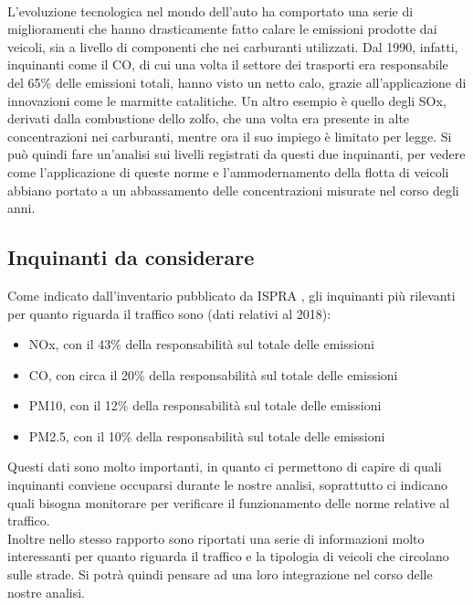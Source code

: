 \documentclass{article}
\begin{document}
\\L'evoluzione tecnologica nel mondo dell'auto ha comportato una serie di miglioramenti che hanno drasticamente fatto calare le emissioni prodotte dai veicoli, sia a livello di componenti che nei carburanti utilizzati. Dal 1990, infatti, inquinanti come il CO, di cui una volta il settore dei trasporti era responsabile del 65\% delle emissioni totali, hanno visto un netto calo, grazie all'applicazione di innovazioni come le marmitte catalitiche. Un altro esempio è quello degli SOx, derivati dalla combustione dello zolfo, che una volta era presente in alte concentrazioni nei carburanti, mentre ora il suo impiego è limitato per legge. Si può quindi fare un'analisi sui livelli registrati da questi due inquinanti, per vedere come l'applicazione di queste norme e l'ammodernamento della flotta di veicoli abbiano portato a un abbassamento delle concentrazioni misurate nel corso degli anni.

\subsection{Inquinanti da considerare}
Come indicato dall'inventario pubblicato da ISPRA \cite{iir2020}, gli inquinanti più rilevanti per quanto riguarda il traffico sono (dati relativi al 2018): 
\begin{itemize}
	\item NOx, con il 43\% della responsabilità sul totale delle emissioni
	\item CO, con circa il 20\% della responsabilità sul totale delle emissioni
	\item PM10, con il 12\% della responsabilità sul totale delle emissioni
	\item PM2.5, con il 10\% della responsabilità sul totale delle emissioni
\end{itemize}
Questi dati sono molto importanti, in quanto ci permettono di capire di quali inquinanti conviene occuparsi durante le nostre analisi, soprattutto ci indicano quali bisogna monitorare per verificare il funzionamento delle norme relative al traffico. 
\\Inoltre nello stesso rapporto sono riportati una serie di informazioni molto interessanti per quanto riguarda il traffico e la tipologia di veicoli che circolano sulle strade. Si potrà quindi pensare ad una loro integrazione nel corso delle nostre analisi.
\newpage
\end{document}
